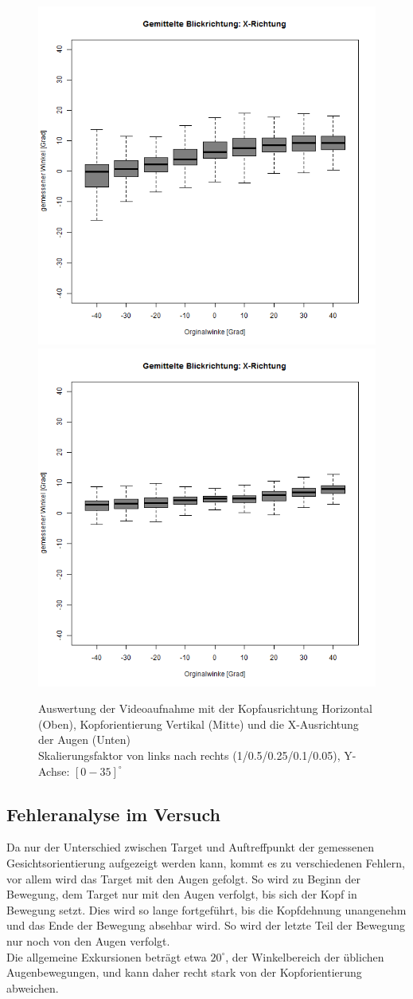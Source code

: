 \begin{figure}
	\includegraphics[width=0.192\linewidth]{OpenFace_Img/EyeAVG_x_S01}
	\includegraphics[width=0.192\linewidth]{OpenFace_Img/EyeAVG_x_S005}
	\caption{Auswertung der Videoaufnahme mit der Kopfausrichtung Horizontal (Oben), Kopforientierung Vertikal (Mitte) und die X-Ausrichtung der Augen (Unten)\\Skalierungsfaktor von links nach rechts (1/0.5/0.25/0.1/0.05), Y-Achse: $[0-35]^\circ$}
	\label{graph_VideoSkalierung}
\end{figure}
\subsection{Fehleranalyse im Versuch}
Da nur der Unterschied zwischen Target und Auftreffpunkt der gemessenen Gesichtsorientierung aufgezeigt werden kann, kommt es zu verschiedenen Fehlern, vor allem wird das Target mit den Augen gefolgt.
So wird zu Beginn der Bewegung, dem Target nur mit den Augen verfolgt, bis sich der Kopf in Bewegung setzt. Dies wird so lange fortgeführt, bis die Kopfdehnung unangenehm und das Ende der Bewegung absehbar wird. So wird der letzte Teil der Bewegung nur noch von den Augen verfolgt.\\
Die allgemeine Exkursionen beträgt etwa $20^\circ$, der Winkelbereich der üblichen Augenbewegungen, und kann daher recht stark von der Kopforientierung abweichen.\cite{wiki_Gesichtsfeld}\\
